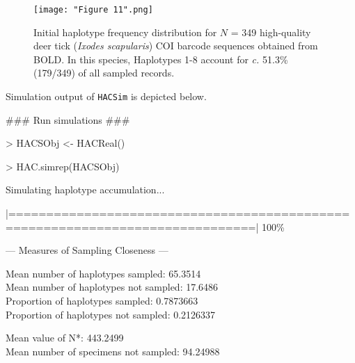 \begin{figure}[H]

\centering

\texttt{[image: "Figure 11".png]}

\caption{Initial haplotype frequency distribution for $N$ = 349 high-quality deer tick (\textit{Ixodes scapularis}) COI barcode sequences obtained from BOLD. In this species, Haplotypes 1-8 account for \textit{c.} 51.3\% (179/349) of all sampled records.
}

\end{figure}


\noindent Simulation output of {\tt HACSim} is depicted below.

\vspace{3mm}

{\tt \scriptsize

{\noindent \#\#\# Run simulations \#\#\#}

\vspace{1mm}

{\noindent > HACSObj <- HACReal()}

\vspace{1mm}

{\noindent > HAC.simrep(HACSObj)} 

\vspace{1mm}

\noindent Simulating haplotype accumulation...

\vspace{2mm}
 
\noindent |==============================================================================| 100\%
  
\vspace{3mm}
 
\noindent --- Measures of Sampling Closeness ---

\vspace{2mm} 
 
\noindent Mean number of haplotypes sampled: 65.3514  \\
Mean number of haplotypes not sampled: 17.6486   \\
Proportion of haplotypes sampled: 0.7873663 \\
Proportion of haplotypes not sampled: 0.2126337   

\vspace{2mm} 
 
\noindent Mean value of N*: 443.2499  \\
Mean number of specimens not sampled: 94.24988

}
